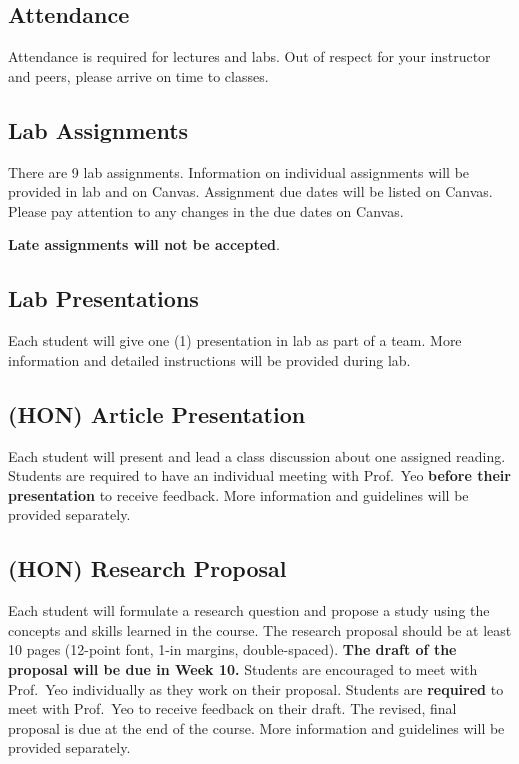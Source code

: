 \documentclass[
  letterpaper,
]{article}
\begin{document}
\subsection{Attendance}\label{attendance}

Attendance is required for lectures and labs. Out of respect for your
instructor and peers, please arrive on time to classes.

\subsection{Lab Assignments}\label{lab-assignments}

There are 9 lab assignments. Information on individual assignments will
be provided in lab and on Canvas. Assignment due dates will be listed on
Canvas. Please pay attention to any changes in the due dates on Canvas.

\textbf{Late assignments will not be accepted}.

\subsection{Lab Presentations}\label{lab-presentations}

Each student will give one (1) presentation in lab as part of a team.
More information and detailed instructions will be provided during lab.

\subsection{\texorpdfstring{\textbf{(HON)} Article
Presentation}{(HON) Article Presentation}}\label{hon-article-presentation}

Each student will present and lead a class discussion about one assigned
reading. Students are required to have an individual meeting with
Prof.~Yeo \textbf{before their presentation} to receive feedback. More
information and guidelines will be provided separately.

\subsection{\texorpdfstring{\textbf{(HON)} Research
Proposal}{(HON) Research Proposal}}\label{hon-research-proposal}

Each student will formulate a research question and propose a study
using the concepts and skills learned in the course. The research
proposal should be at least 10 pages (12-point font, 1-in margins,
double-spaced). \textbf{The draft of the proposal will be due in Week
10.} Students are encouraged to meet with Prof.~Yeo individually as they
work on their proposal. Students are \textbf{required} to meet with
Prof.~Yeo to receive feedback on their draft. The revised, final
proposal is due at the end of the course. More information and
guidelines will be provided separately.
\end{document}
